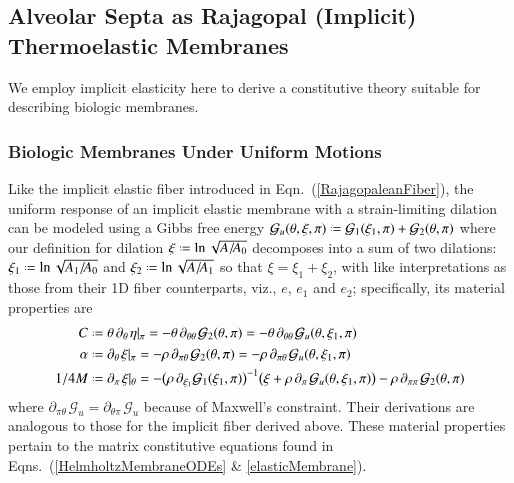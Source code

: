 \subsection{Alveolar Septa as Rajagopal (Implicit) Thermoelastic Membranes}

We employ implicit elasticity here to derive a constitutive theory suitable for describing biologic membranes.

\subsubsection{Biologic Membranes Under Uniform Motions}

Like the implicit elastic fiber introduced in Eqn.~(\ref{RajagopaleanFiber}), the uniform response of an implicit elastic membrane with a strain-limiting dilation can be modeled using a Gibbs free energy $\mathcal{G}_u (\theta , \xi , \pi ) \defeq \mathcal{G}_1 (\xi_1 ,\pi) + \mathcal{G}_2 (\theta , \pi)$ where our definition for dilation $\xi \defeq \ln \sqrt{A / \! A_0}$ decomposes into a sum of two dilations: $\xi_1 \defeq \ln \sqrt{A_1 / \! A_0}$ and $\xi_2 \defeq \ln \sqrt{A / \! A_1}$ so that $\xi = \xi_1 + \xi_2$, with like interpretations as those from their 1D fiber counterparts, viz., $e$, $e_1$ and $e_2$; specifically, its material properties are
\begin{subequations}
    \label{physicalFields2Dmembrane}
    \begin{align}
    C & \defeq \theta \, \partial_{\theta\,} \eta |_{\pi} = 
    -\theta \, \partial_{\theta\theta\,} \mathcal{G}_2 (\theta , \pi) =
    -\theta \, \partial_{\theta\theta\,} \mathcal{G}_u  (\theta , \xi_1 , \pi)
    \label{specificHeat2Dmembrane} \\
    \alpha & \defeq \partial_{\theta\,} \xi |_{\pi} = 
    -\rho \, \partial_{\pi\theta\,} \mathcal{G}_2 (\theta , \pi) = 
    -\rho \, \partial_{\pi\theta\,} \mathcal{G}_u (\theta , \xi_1 , \pi)
    \label{thermalExpansion2Dmembrane} \\
    1/4M & \defeq \partial_{\pi\,} \xi |_{\theta} = -
    \bigl( \rho \, \partial_{\xi_1} \mathcal{G}_1 ( \xi_1, \pi ) \bigr)^{-1} 
    \bigl( \xi + \rho \, \partial_{\pi\,} \mathcal{G}_u (\theta , \xi_1 , \pi ) \bigr) -
    \rho \, \partial_{\pi\pi\,} \mathcal{G}_2(\theta , \pi)
    \label{compliance2Dmembrane}
    \end{align}
\end{subequations}
where $\partial_{\pi\theta\,} \mathcal{G}_u = \partial_{\theta\pi\,} \mathcal{G}_u$ because of Maxwell's constraint.  Their derivations are analogous to those for the implicit fiber derived above.    These material properties pertain to the matrix constitutive equations found in Eqns.~(\ref{HelmholtzMembraneODEs} \& \ref{elasticMembrane}).

